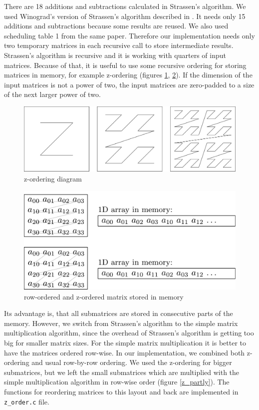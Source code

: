 \documentclass{article}
\begin{document}
There are 18 additions and subtractions calculated in Strassen's algorithm. 
We used Winograd's version of Strassen's algorithm described in \cite{boyer2009memory}.
It needs only 15 additions and subtractions because some results are reused.
We also used scheduling table 1 from the same paper. 
Therefore our implementation needs only two temporary matrices in each recursive call to store intermediate results.
Strassen's algorithm is recursive and it is working with quarters of input matrices. 
Because of that, it is useful to use some recursive ordering for storing matrices in memory, for example z-ordering (figures \ref{z_diagram}, \ref{z_mem}).
If the dimension of the input matrices is not a power of two, the input matrices are zero-padded to a size of the next larger power of two.

\begin{figure}[htbp]
\centerline{\includegraphics[scale=.3]{z_ordering.pdf}}
\caption{z-ordering diagram}
\label{z_diagram}
\end{figure}

\begin{figure}[htbp]
\centerline{\includegraphics[scale=.35]{mem_ordering.pdf}}
\caption{row-ordered and z-ordered matrix stored in memory}
\label{z_mem}
\end{figure}

Its advantage is, that all submatrices are stored in consecutive parts of the memory.
However, we switch from Strassen's algorithm to the simple matrix multiplication algorithm,
since the overhead of Strassen's algorithm is getting too big for smaller matrix sizes.
For the simple matrix multiplication it is better to have the matrices ordered row-wise.
In our implementation, we combined both z-ordering and usual row-by-row ordering.
We used the z-ordering for bigger submatrices, but
we left the small submatrices which are multiplied with the simple multiplication algorithm
in row-wise order (figure \ref{z_partly}). The functions for reordering matrices to this layout
and back are implemented in \texttt{z\_order.c} file.
\end{document}
